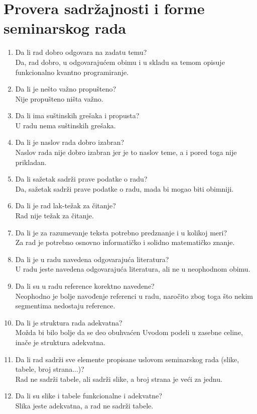 \documentclass[a4paper]{report}
\begin{document}
\section{Provera sadržajnosti i forme seminarskog rada}

\begin{enumerate}
\item Da li rad dobro odgovara na zadatu temu?\\
Da, rad dobro, u odgovarajućem obimu i u skladu sa temom opisuje funkcionalno kvantno programiranje.
\item Da li je nešto važno propušteno?\\
Nije propušteno ništa važno.
\item Da li ima suštinskih grešaka i propusta?\\
U radu nema suštinskih grešaka.
\item Da li je naslov rada dobro izabran?\\
Naslov rada nije dobro izabran jer je to naslov teme, a i pored toga nije prikladan.
\item Da li sažetak sadrži prave podatke o radu?\\
Da, sažetak sadrži prave podatke o radu, mada bi mogao biti obimniji.
\item Da li je rad lak-težak za čitanje?\\
Rad nije težak za čitanje.
\item Da li je za razumevanje teksta potrebno predznanje i u kolikoj meri?\\
Za rad je potrebno osnovno informatičko i solidno matematičko znanje.
\item Da li je u radu navedena odgovarajuća literatura?\\
U radu jeste navedena odgovarajuća literatura, ali ne u neophodnom obimu.
\item Da li su u radu reference korektno navedene?\\
Neophodno je bolje navođenje referenci u radu, naročito zbog toga što nekim segmentima nedostaju reference.
\item Da li je struktura rada adekvatna?\\
Možda bi bilo bolje da se deo obuhvaćen Uvodom podeli u zasebne celine, inače je struktura adekvatna.
\item Da li rad sadrži sve elemente propisane uslovom seminarskog rada (slike, tabele, broj strana...)?\\
Rad ne sadrži tabele, ali sadrži slike, a broj strana je veći za jednu.
\item Da li su slike i tabele funkcionalne i adekvatne?\\
Slika jeste adekvatna, a rad ne sadrži tabele.
\end{enumerate}
\end{document}
